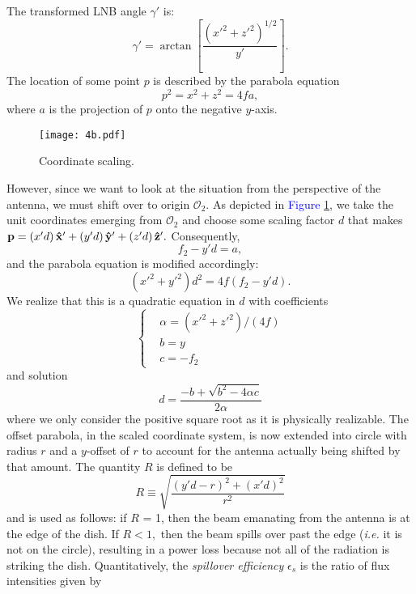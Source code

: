 \documentclass[11pt]{article}
\begin{document}
The transformed LNB angle $\gamma'$ is:
	\begin{equation}
		\gamma'=\arctan\left[\frac{\left(x'^2+z'^2\right)^{1/2}}{y'}\right].
	\end{equation}
The location of some point $p$ is described by the parabola equation
	\begin{equation}
		p^2 = x^2 + z^2 = 4fa,
	\end{equation}
where $a$ is the projection of $p$ onto the negative $y$-axis. 
	\begin{figure}[h]
		\centering
		\texttt{[image: 4b.pdf]}
		\caption{Coordinate scaling.}
		\label{C}
	\end{figure}
However, since we want to look at the situation from the perspective of the antenna, we must shift over to origin $\mathcal{O}_2$. As depicted in \textcolor{blue}{Figure} \ref{C}, we take the unit coordinates emerging from $\mathcal{O}_2$ and choose some scaling factor $d$ that makes $\bold{p}=(x'd)\,\bold{\hat{x}'}+(y'd)\,\bold{\hat{y}'}+(z'd)\,\bold{\hat{z}'}.$  Consequently, 
\begin{equation}
f_2-y'd = a,
\end{equation}
and the parabola equation is modified accordingly:
	\begin{equation}
		(x'^2+y'^2)d^2=4f(f_2-y'd).
	\end{equation}
We realize that this is a quadratic equation in $d$ with coefficients
\begin{equation}
	\left\{\begin{matrix}
&\alpha=(x'^2+z'^2)/(4f)\\ 
&b=y\\ 
&c=-f_2
\end{matrix}\right.
\end{equation}
and solution
	\begin{equation}
		d = \frac{-b+\sqrt{b^2-4\alpha c}}{2\alpha}
	\end{equation}
where we only consider the positive square root as it is physically realizable. The offset parabola, in the scaled coordinate system, is now extended into circle with radius $r$ and a $y$-offset of $r$ to account for the antenna actually being shifted by that amount. The quantity $R$ is defined to be
\begin{equation}
	R \equiv \sqrt{\frac{(y'd-r)^2+(x'd)^2}{r^2}}
\end{equation}
and is used as follows: if $R$ = 1, then the beam emanating from the antenna is at the edge of the dish. If $R<1,$ then the beam spills over past the edge (\textit{i.e.} it is not on the circle), resulting in a power loss because not all of the radiation is striking the dish. Quantitatively, the \textit{spillover efficiency} $\epsilon_s$ is the ratio of flux intensities \cite{Balanis1997} given by
\end{document}
